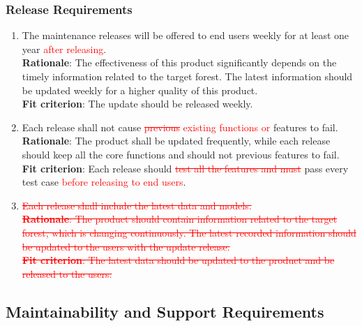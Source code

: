 \documentclass{article}
\begin{document}
\subsubsection{Release Requirements}
\begin{enumerate}[OE4.1]
    \item The maintenance releases will be offered to end users weekly for at least one year
   \textcolor{red}{after releasing}.\\
    \textbf{Rationale}: The effectiveness of this product significantly depends on the timely information related to the target forest. The latest information should be updated weekly for a higher quality of this product.\\
    \textbf{Fit criterion}: The update should be released weekly.\\
    \item Each release shall not cause \textcolor{red}{\st{previous} existing functions or
    } features to fail. \\
    \textbf{Rationale}: The product shall be updated frequently, while each release should keep all the core functions and should not previous features to fail.\\
    \textbf{Fit criterion}: Each release should \textcolor{red}{\st{test all the features and must}}
     pass every test case \textcolor{red}{before releasing to end users}.\\
    
    \item \textcolor{red}{\st{Each release shall include the latest data and models. \\
    \textbf{Rationale}: The product should contain information related to the target forest, which is
     changing continuously. The latest recorded information should be updated to the users with the
      update release.\\
    \textbf{Fit criterion}: The latest data should be updated to the product and be released to the
     users. }}
\end{enumerate}
\subsection{Maintainability and Support Requirements}
\end{document}

